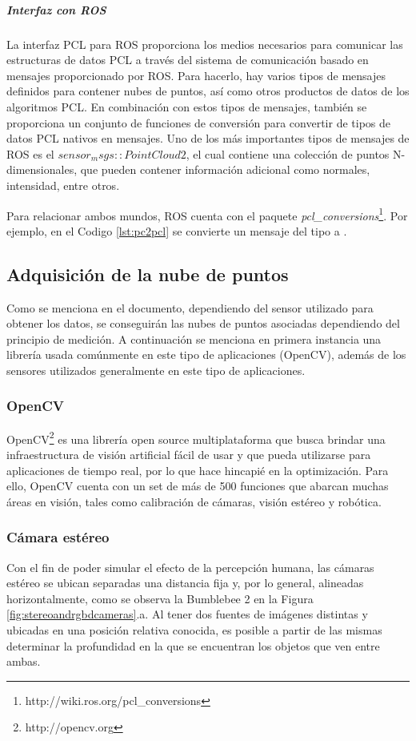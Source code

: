 \ifimagenes
    \ifimagenespaper
    \else
    \subparagraph{Interfaz con ROS}
    \fi
\fi
La interfaz PCL para ROS proporciona los medios necesarios para comunicar las estructuras de datos PCL a través del sistema de comunicación basado en mensajes proporcionado por ROS. Para hacerlo, hay varios tipos de mensajes definidos para contener nubes de puntos, así como otros productos de datos de los algoritmos PCL. En combinación con estos tipos de mensajes, también se proporciona un conjunto de funciones de conversión para convertir de tipos de datos PCL nativos en mensajes. Uno de los más importantes tipos de mensajes de ROS es el $sensor_msgs::PointCloud2$, el cual contiene una colección de puntos N-dimensionales, que pueden contener información adicional como normales, intensidad, entre otros.

Para relacionar ambos mundos, ROS cuenta con el paquete \textit{pcl\_conversions}\footnote{http://wiki.ros.org/pcl\_conversions}. Por ejemplo, en el Codigo \ref{lst:pc2pcl} se convierte un mensaje del tipo  a .




\subsection{Adquisición de la nube de puntos}
Como se menciona en el documento, dependiendo del sensor utilizado para obtener los datos, se conseguirán las nubes de puntos asociadas dependiendo del principio de 
\ifimagenes
medición. A continuación se menciona en primera instancia una librería usada comúnmente en este tipo de aplicaciones (OpenCV), además de los sensores utilizados generalmente en este tipo de aplicaciones.

\subsubsection{OpenCV}
OpenCV\footnote{http://opencv.org} es una librería open source multiplataforma que busca brindar una infraestructura de visión artificial fácil de usar y que pueda utilizarse para aplicaciones de tiempo real, por lo que hace hincapié en la optimización. Para ello, OpenCV cuenta con un set de más de 500 funciones \cite{kaehler2017} que abarcan muchas áreas en visión, tales como calibración de cámaras, visión estéreo y robótica.

\subsubsection{Cámara estéreo}
Con el fin de poder simular el efecto de la percepción humana, las cámaras estéreo se ubican separadas una distancia fija y, por lo general, alineadas horizontalmente, como se observa la Bumblebee 2 en la Figura \ref{fig:stereoandrgbdcameras}.a. Al tener dos fuentes de imágenes distintas y ubicadas en una posición relativa conocida, es posible a partir de las mismas determinar la profundidad en la que se encuentran los objetos que ven entre ambas. 

